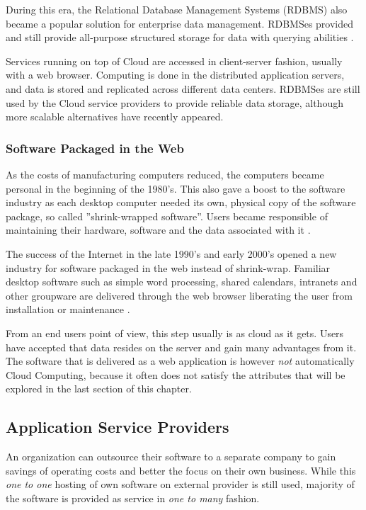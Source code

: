 \documentclass{tktltiki}
\begin{document}
During this era, the Relational Database Management Systems (RDBMS) also became a popular solution for enterprise data management.  RDBMSes provided and still provide all-purpose structured storage for data with querying abilities \cite{ClientServer96}.

Services running on top of Cloud are accessed in client-server fashion, usually with a web browser.  Computing is done in the distributed application servers, and data is stored and replicated across different data centers.  RDBMSes are still used by the Cloud service providers to provide reliable data storage, although more scalable alternatives have recently appeared. 


\subsubsection{Software Packaged in the Web}

As the costs of manufacturing computers reduced, the computers became personal in the beginning of the 1980's.  This also gave a boost to the software industry as each desktop computer needed its own, physical copy of the software package, so called ''shrink-wrapped software''.  Users became responsible of maintaining their hardware, software and the data associated with it \cite{CloudComputing}. 

The success of the Internet in the late 1990's and early 2000's opened a new industry for software packaged in the web instead of shrink-wrap.  Familiar desktop software such as simple word processing, shared calendars, intranets and other groupware are delivered through the web browser liberating the user from installation or maintenance \cite{Cusumano10}.

From an end users point of view, this step usually is as cloud as it gets.  Users have accepted that data resides on the server and gain many advantages from it.  The software that is delivered as a web application is however \emph{not} automatically Cloud Computing, because it often does not satisfy the attributes that will be explored in the last section of this chapter.



\subsection{Application Service Providers}

An organization can outsource their software to a separate company to gain savings of operating costs and better the focus on their own business.  While this \emph{one to one} hosting of own software on external provider is still used, majority of the software is provided as service in \emph{one to many} fashion.
\end{document}
